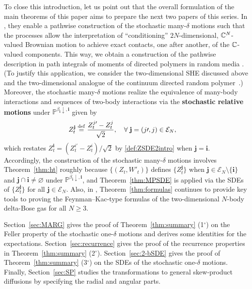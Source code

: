 \documentclass[12pt, twoside]{article}
\numberwithin{figure}{section}
\newcommand{\1}{\mathds 1}
\newcommand{\da}{{\downarrow}}
\renewcommand{\P}{{\mathbb P}}
\newcommand{\mc}{\mathcal}
\newcommand{\2}{{\mathbf 1}}
\newcommand{\defeq}{{\stackrel{\rm def}{=}}}
\newcommand{\cc}{{^\circ}}
\newcommand{\bi}{\mathbf i}
\newcommand{\bj}{\mathbf j}
\newcommand{\two}{{\sqrt{2}}}
\newcommand{\CN}{{\mathbb C}^{\it N}}
\begin{document}
To close this introduction, let us point out that the overall formulation of the main theorems of this paper aims to prepare the next two papers \cite{C:SDBG2, C:SDBG3} of this series. In \cite{C:SDBG2}, they enable a pathwise construction of the stochastic many-$\delta$ motions such that the processes allow the interpretation of ``conditioning'' $2N$-dimensional, $\CN$-valued Brownian motion to achieve exact contacts, one after another, of the $\Bbb C$-valued components. 
This way, we obtain a construction of the pathwise description in path integrals of moments of directed polymers in random media \cite{KZ:87}. (To justify this application, we consider the two-dimensional SHE discussed above and the two-dimensional analogue of the continuum directed random polymer~\cite{AKQ:14}.)
Moreover, the stochastic many-$\delta$ motions realize the equivalence of many-body interactions and sequences of two-body interactions via the {\bf stochastic relative motions} under $\P^{\beta_\bi\da,\bi}$ given by
\begin{align}
Z^\bj_t&\;\defeq\;\frac{Z^{j\prime}_t-Z^j_t}{\two}, \quad \forall\;\bj=(j\prime,j)\in \mc E_N,\label{def:Zbj}
\end{align}
which restates $Z^\bi_t=(Z^{i\prime}_t-Z^i_t)/\two$ by \eqref{def:ZSDE2intro} when $\bj=\bi$. Accordingly,
the construction of the stochastic many-$\delta$ motions involves Theorem~\ref{thm:ht} roughly because $\{(Z_t,W'_t)\}$ defines $\{Z^{\bj}_t\}$ when $\bj\in \mc E_N\setminus\{\bi\}$ and $\bj\cap \bi\neq \varnothing$ under $\P^{\beta_\bi\da,\bi}$, and Theorem~\ref{thm:MPSDE} is applied via the SDEs of $\{Z^\bj_t\}$ for all $\bj\in \mc E_N$. Also, 
in \cite{C:SDBG3}, Theorem~\ref{thm:formulas} continues to provide key tools
to proving the Feynman--Kac-type formulas of the two-dimensional $N$-body delta-Bose gas for all $N\geq 3$.\smallskip 

 Section~\ref{sec:MARG} gives the proof of Theorem~\ref{thm:summary} (1$\cc$) on the Feller property of the stochastic one-$\delta$ motions and derives some identities for the expectations. Section~\ref{sec:recurrence} gives the proof of the recurrence properties in Theorem~\ref{thm:summary} (2$\cc$). Section~\ref{sec:2-bSDE} gives the proof of Theorem~\ref{thm:summary} (3$\cc$) on the SDEs of the stochastic one-$\delta$ motions. Finally, Section~\ref{sec:SP} studies the transformations to general skew-product diffusions by specifying the radial and angular parts. \smallskip
\end{document}
